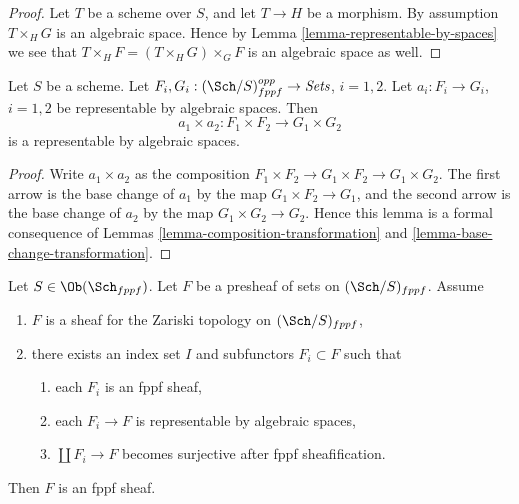 \begin{proof}
Let $T$ be a scheme over $S$, and let $T \to H$ be a morphism.
By assumption $T \times_H G$ is an algebraic space. Hence by
Lemma \ref{lemma-representable-by-spaces}
we see that $T \times_H F = (T \times_H G) \times_G F$ is an
algebraic space as well.
\end{proof}

\begin{lemma}
\label{lemma-product-transformations}
Let $S$ be a scheme.
Let $F_i, G_i : (\Sch/S)_{fppf}^{opp} \to \textit{Sets}$, $i = 1, 2$.
Let $a_i : F_i \to G_i$, $i = 1, 2$
be representable by algebraic spaces.
Then
$$
a_1 \times a_2 : F_1 \times F_2 \longrightarrow G_1 \times G_2
$$
is a representable by algebraic spaces.
\end{lemma}

\begin{proof}
Write $a_1 \times a_2$ as the composition
$F_1 \times F_2 \to G_1 \times F_2 \to G_1 \times G_2$.
The first arrow is the base change of $a_1$ by the map
$G_1 \times F_2 \to G_1$, and the second arrow
is the base change of $a_2$ by the map
$G_1 \times G_2 \to G_2$. Hence this lemma is a formal
consequence of Lemmas \ref{lemma-composition-transformation}
and \ref{lemma-base-change-transformation}.
\end{proof}

\begin{lemma}
\label{lemma-glueing-sheaves}
Let $S \in \Ob(\Sch_{fppf})$. Let $F$ be a presheaf of sets on
$(\Sch/S)_{fppf}$. Assume
\begin{enumerate}
\item $F$ is a sheaf for the Zariski topology on $(\Sch/S)_{fppf}$,
\item there exists an index set $I$ and subfunctors $F_i \subset F$ such that
\begin{enumerate}
\item each $F_i$ is an fppf sheaf,
\item each $F_i \to F$ is representable by algebraic spaces,
\item $\coprod F_i \to F$ becomes surjective after fppf sheafification.
\end{enumerate}
\end{enumerate}
Then $F$ is an fppf sheaf.
\end{lemma}

